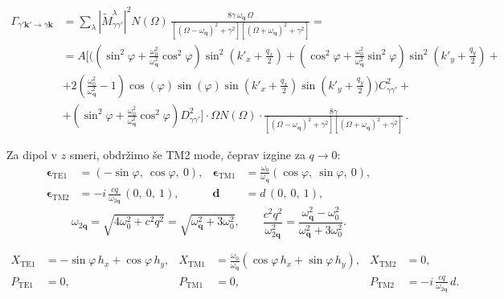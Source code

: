 \documentclass[a4paper,10pt]{article}
\begin{document}
\begin{tcolorbox}
\begin{align} \label{gam_photon_numerika}
\Gamma_{\gamma'\mathbf{k}'\to\gamma\mathbf{k}}
&= \sum_{\lambda}\left|\widetilde{M}^{\lambda}_{\gamma\gamma'}\right|^2
N(\Omega)\,\frac{8\gamma\,\omega_{\mathbf{q}}\,\Omega}
{\left[(\Omega-\omega_{\mathbf{q}})^2+\gamma^2\right]\left[(\Omega+\omega_{\mathbf{q}})^2+\gamma^2\right]} = \nonumber \\ 
 &= A \Bigg[
\Bigg(\left(\sin^2\varphi + \frac{\omega_0^2}{\omega_{\mathbf{q}}^2}\cos^2\varphi\right) \sin^2\left(k'_x + \tfrac{q_x}{2}\right) + \left(\cos^2\varphi + \frac{\omega_0^2}{\omega_{\mathbf{q}}^2}\sin^2\varphi\right) \sin^2\left(k'_y + \tfrac{q_y}{2}\right) + \nonumber \\
&+ 2 \left(\frac{\omega_0^2}{\omega_{\mathbf{q}}^2} -1\right)\cos(\varphi)\sin(\varphi) \sin\left(k'_x + \tfrac{q_x}{2}\right)\sin\left(k'_y + \tfrac{q_y}{2}\right)\Bigg) C_{\gamma\gamma'}^2 +\nonumber \\
&+ \left(\sin^2\varphi + \frac{\omega_0^2}{\omega_{\mathbf{q}}^2}\cos^2\varphi\right) D_{\gamma\gamma'}^2 \Bigg]\cdot\Omega N(\Omega)\cdot\frac{8\gamma}
{\left[(\Omega-\omega_{\mathbf{q}})^2+\gamma^2\right]\left[(\Omega+\omega_{\mathbf{q}})^2+\gamma^2\right]}\,.
\end{align}
\end{tcolorbox}
Za dipol v $z$ smeri, obdržimo še TM2 mode, čeprav izgine za $q\to 0$:
\begin{align}
\boldsymbol{\epsilon}_{\mathrm{TE1}} &= (-\sin\varphi,\ \cos\varphi,\ 0), &
\boldsymbol{\epsilon}_{\mathrm{TM1}} &= \frac{\omega_0}{\omega_{\mathbf{q}}}(\cos\varphi,\ \sin\varphi,\ 0),\\
\boldsymbol{\epsilon}_{\mathrm{TM2}} &= -i\,\frac{cq}{\omega_{2\mathbf{q}}}\,(0,\ 0,\ 1), &
\mathbf{d} &= d\,(0,\ 0,\ 1),
\end{align}
\begin{equation}
\omega_{2\mathbf{q}} = \sqrt{4\omega_0^2 + c^2q^2} = \sqrt{\omega_{\mathbf{q}}^2 + 3\omega_0^2},
\qquad
\frac{c^2q^2}{\omega_{2\mathbf{q}}^2} = \frac{\omega_{\mathbf{q}}^2-\omega_0^2}{\omega_{\mathbf{q}}^2+3\omega_0^2}.
\end{equation}

\begin{align}
X_{\mathrm{TE1}} &= -\sin\varphi\, h_x + \cos\varphi\, h_y, &
X_{\mathrm{TM1}} &= \frac{\omega_0}{\omega_{\mathbf{q}}}\left(\cos\varphi\, h_x + \sin\varphi\, h_y\right), &
X_{\mathrm{TM2}} &= 0,\\
P_{\mathrm{TE1}} &= 0, &
P_{\mathrm{TM1}} &= 0, &
P_{\mathrm{TM2}} &= -i\,\frac{cq}{\omega_{2\mathbf{q}}}\,d .
\end{align}
\end{document}
